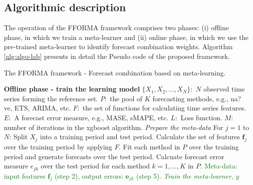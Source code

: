 \documentclass[11pt,a4paper,]{article}
\theoremstyle{definition}
\theoremstyle{definition}
\theoremstyle{definition}
\theoremstyle{remark}
\begin{document}
\subsection{Algorithmic description}\label{algorithmic-description}

The operation of the FFORMA framework comprises two phases: (i) offline
phase, in which we train a meta-learner and (ii) online phase, in which
we use the pre-trained meta-learner to identify forecast combination
weights. Algorithm \ref{alg:algo-lab} presents in detail the Pseudo code
of the proposed framework.

\begin{algorithm}[!ht]
  \caption{The FFORMA framework - Forecast combination based on meta-learning. }
  \label{alg:algo-lab}
  \begin{algorithmic}[1]
    \Statex \textbf{Offline phase - train the learning model}
    \Statex {}
    \Statex \hspace{1cm}$\{X_1, X_2, \dots,X_N\}:$ $N$ observed time series forming the reference set.
      \Statex \hspace{1cm}$P:$ the pool of $K$ forecasting methods, e.g., na?ve, ETS, ARIMA, etc.
         \Statex \hspace{1cm}$F:$ the set of functions for calculating time series features.
         \Statex \hspace{1cm}$E:$ A forecast error measure, e.g., MASE, sMAPE, etc.
           \Statex \hspace{1cm}$L:$ Loss function.
           \Statex \hspace{1cm}$M:$ number of iterations in the xgboost algorithm.
     \Statex {}
      \Statex \hspace{1cm}
      \Statex {}
    \Statex \textit{Prepare the meta-data}
    \Statex For $j=1$ to $N$:
            \State Split $X_j$ into a training period and test period.
            \State Calculate the set of features $\bm{f}_j$ over the training period by applying $F$.
            \State Fit each method in $P$ over the training period and generate forecasts over the test period.
            \State Calcuate forecast error measure  $e_{jk}$ over the test period for each method $k=1,\ldots, K$ in $P$.
 \textcolor{green}{\State Meta-data: input features $\bm{f}_j$ (step 2), output errors: $\bm{e}_{jk}$ (step 5).
     \Statex
    \Statex \textit{Train the meta-learner, $y$}
}
\end{algorithmic}
\end{algorithm}
\end{document}
